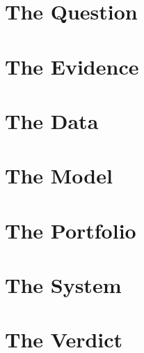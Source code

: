
\part{The Question}
\label{part:question}






\part{The Evidence}
\label{part:evidence}







\part{The Data}
\label{part:data}






\part{The Model}
\label{part:model}







\part{The Portfolio}
\label{part:portfolio}







\part{The System}
\label{part:system}






\part{The Verdict}
\label{part:verdict}






